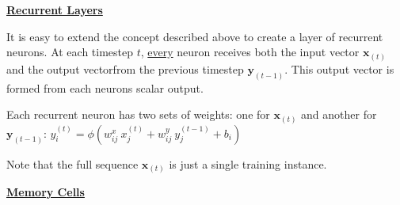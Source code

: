 \newpage
\textbf{\underline{Recurrent Layers}}

It is easy to extend the concept described above to create a layer of recurrent neurons.\newline
At each timestep $t$, \underline{every} neuron receives both the input vector $\boldsymbol{x}_{(t)}$
and the output vector\newline from the previous timestep $\boldsymbol{y}_{(t-1)}$.
This output vector is formed from each neurons scalar output.

Each recurrent neuron has two sets of weights: one for $\boldsymbol{x}_{(t)}$ and another for $\boldsymbol{y}_{(t-1)}$:\newline
$y^{(t)}_i = \phi (w^x_{ij} \: x^{(t)}_j + w^y_{ij} \: y^{(t-1)}_j + b_i)$

Note that the full sequence $\boldsymbol{x}_{(t)}$ is just a single training instance.

\textbf{\underline{Memory Cells}}

\newpage